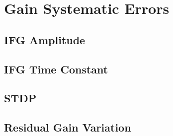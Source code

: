 
\graphicspath{{Body/Figures/Gain/}}

\section{Gain Systematic Errors}

\subsection{IFG Amplitude}

\subsection{IFG Time Constant}

\subsection{STDP}

\subsection{Residual Gain Variation}

